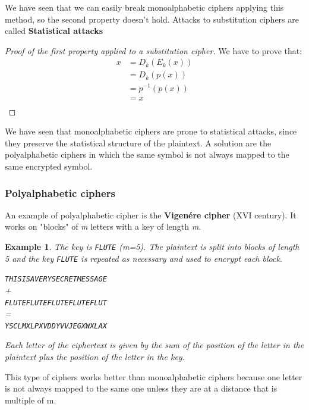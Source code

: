 \documentclass[a4paper, 12pt]{report}
\newtheorem{example}{\textbf{Example}}
\begin{document}
We have seen that we can easily break monoalphabetic ciphers applying this method, so the second property doesn't hold. Attacks to substitution ciphers are called \textbf{Statistical attacks}

\begin{proof}[Proof of the first property applied to a substitution cipher]
	We have to prove that:
	\setcounter{equation}{0}
	\begin{align}
		x &= D_k(E_k(x)) \\
		&=D_k(p(x)) \\
		&=p^{-1}(p(x)) \\
		&=x\\
	\end{align}
\end{proof}

We have seen that monoalphabetic ciphers are prone to statistical attacks, since they preserve the statistical structure of the plaintext. A solution are the polyalphabetic ciphers in which the same symbol is not always mapped to the same encrypted symbol.

\subsubsection{Polyalphabetic ciphers}
An example of polyalphabetic cipher is the \textbf{Vigenére cipher} (XVI century). It works on "blocks" of \textit{m} letters with a key of length \textit{m}.
\begin{example}
	The key is \texttt{FLUTE} (m=5). The plaintext is split into blocks of length 5 and the key \texttt{FLUTE} is repeated as necessary and used to encrypt each block.
	\begin{center}
		\texttt{THISISAVERYSECRETMESSAGE}\\
		+\\
		\texttt{FLUTEFLUTEFLUTEFLUTEFLUT}\\
		=\\
		\texttt{YSCLMXLPXVDDYVVJEGXWXLAX}
	\end{center}
	\vspace{5mm}
	Each letter of the ciphertext is given by the sum of the position of the letter in the plaintext plus the position of the letter in the key.
\end{example}
This type of ciphers works better than monoalphabetic ciphers because one letter is not always mapped to the same one unless they are at a distance that is multiple of m.\\
\end{document}
